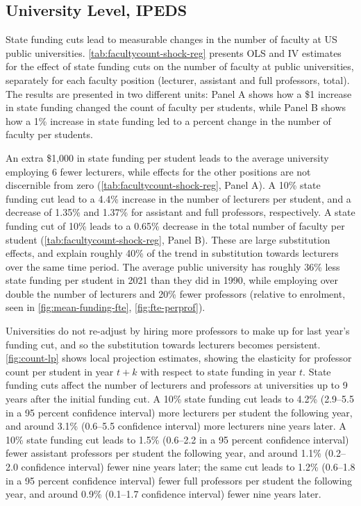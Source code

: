 \subsection{University Level, IPEDS}
\label{sec:results-ipeds}
State funding cuts lead to measurable changes in the number of faculty at US public universities.
\autoref{tab:facultycount-shock-reg} presents OLS and IV estimates for the effect of state funding cuts on the number of faculty at public universities, separately for each faculty position (lecturer, assistant and full professors, total).
The results are presented in two different units: Panel A shows how a \$1 increase in state funding changed the count of faculty per students, while Panel B shows how a 1\% increase in state funding led to a percent change in the number of faculty per students.

An extra \$1,000 in state funding per student leads to the average university employing 6 fewer lecturers, while effects for the other positions are not discernible from zero (\autoref{tab:facultycount-shock-reg}, Panel A).
A 10\% state funding cut lead to a 4.4\% increase in the number of lecturers per student, and a decrease of 1.35\% and 1.37\% for assistant and full professors, respectively.
A state funding cut of 10\% leads to a 0.65\% decrease in the total number of faculty per student (\autoref{tab:facultycount-shock-reg}, Panel B).
These are large substitution effects, and explain roughly 40\% of the trend in substitution towards lecturers over the same time period.
The average public university has roughly 36\% less state funding per student in 2021 than they did in 1990, while employing over double the number of lecturers and 20\% fewer professors (relative to enrolment, seen in \autoref{fig:mean-funding-fte}, \ref{fig:fte-perprof}).

Universities do not re-adjust by hiring more professors to make up for last year's funding cut, and so the substitution towards lecturers becomes persistent.
\autoref{fig:count-lp} shows local projection estimates, showing the elasticity for professor count per student in year $t+k$ with respect to state funding in year $t$.
State funding cuts affect the number of lecturers and professors at universities up to 9 years after the initial funding cut.
A 10\% state funding cut leads to 4.2\% (2.9--5.5 in a 95 percent confidence interval) more lecturers per student the following year, and around 3.1\% (0.6--5.5 confidence interval) more lecturers nine years later.
A 10\% state funding cut leads to 1.5\% (0.6--2.2 in a 95 percent confidence interval) fewer assistant professors per student the following year, and around 1.1\% (0.2--2.0 confidence interval) fewer nine years later;
the same cut leads to 1.2\% (0.6--1.8 in a 95 percent confidence interval) fewer full professors per student the following year, and around 0.9\% (0.1--1.7 confidence interval) fewer nine years later.

